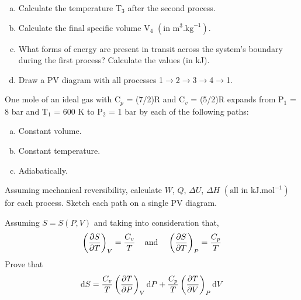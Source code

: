 \begin{MyTutorial}{}
\begin{problem}
\begin{enumerate}[a)]
        \item Calculate the temperature T$_{3}$ after the second process.%
        \item Calculate the final specific volume V$_{4}$ $\left(\text{in m}^{3}\text{.kg}^{-1}\right)$. %
        \item What forms of energy are present in transit across the system's boundary during the first process? Calculate the values (in kJ). %
        \item Draw a PV diagram with all processes 1$\rightarrow$2$\rightarrow$3$\rightarrow$4$\rightarrow$1.
     \end{enumerate}
  \end{problem}
%
  \begin{problem}\label{Chapter:SecondLaw:Problem:05} %
     One mole of an ideal gas with C$_{p}$ = (7/2)R and C$_{v}$ = (5/2)R expands from P$_{1}$ = 8 bar and T$_{1}$ = 600 K to P$_{2}$ = 1 bar by each of the following paths:
     \begin{enumerate}[a)] 
        \item Constant volume.%
        \item Constant temperature.%
        \item Adiabatically.%
     \end{enumerate}
Assuming mechanical reversibility, calculate $W$, $Q$, $\Delta U$, $\Delta H$ $\left(\text{all in kJ.mol}^{-1}\right)$ for each process. Sketch each path on a single PV diagram.
  \end{problem}
%
  \begin{problem}\label{Chapter:SecondLaw:Problem:06} %
     Assuming $S = S\left(P,V\right)$ and taking into consideration that,
       \begin{displaymath}
          \left(\displaystyle\frac{\partial S}{\partial T}\right)_{V} = \displaystyle\frac{C_{v}}{T}\;\;\;\text{ and }\;\;\; \left(\displaystyle\frac{\partial S}{\partial T}\right)_{P} = \displaystyle\frac{C_{p}}{T}
       \end{displaymath}
     Prove that 
       \begin{displaymath}
          \mathrm{d} S = \displaystyle\frac{C_{v}}{T}\left(\displaystyle\frac{\partial T}{\partial P}\right)_{V}\mathrm{d} P + \displaystyle\frac{C_{p}}{T}\left(\displaystyle\frac{\partial T}{\partial V}\right)_{P}\mathrm{d} V
       \end{displaymath}
  \end{problem}
%
\end{MyTutorial}
